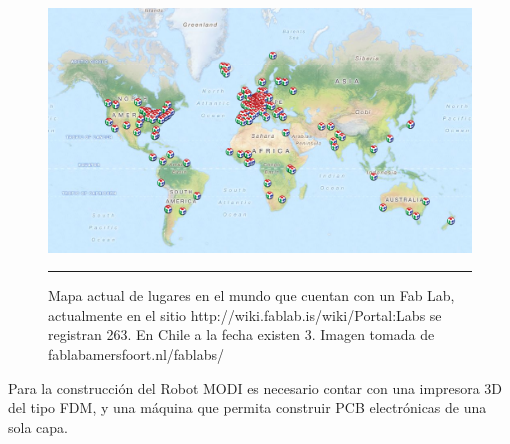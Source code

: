 \begin{figure}[htbp]
	\centering
		\includegraphics[width=\textwidth]{./Figures/map.png}
		\rule{35em}{0.5pt}
	\caption[Mapa Fab Labs en el mundo.]{Mapa actual de lugares en el mundo que cuentan con un Fab Lab, actualmente en el sitio http://wiki.fablab.is/wiki/Portal:Labs se registran 263. En Chile a la fecha existen 3. Imagen tomada de fablabamersfoort.nl/fablabs/}
	\label{fig:Fablabs}
\end{figure}	

Para la construcción del Robot MODI es necesario contar con una impresora 3D del tipo FDM, y una máquina que permita construir PCB electrónicas de una sola capa.



